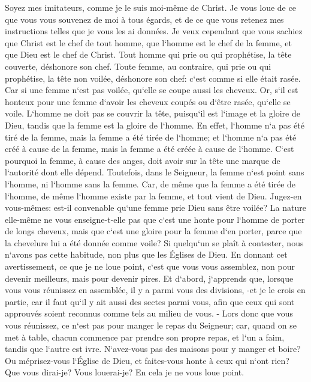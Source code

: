 \verse Soyez mes imitateurs, comme je le suis moi-même de Christ. 
\verse Je vous loue de ce que vous vous souvenez de moi à tous égards, et de ce que vous retenez mes instructions telles que je vous les ai données. 
\verse Je veux cependant que vous sachiez que Christ est le chef de tout homme, que l`homme est le chef de la femme, et que Dieu est le chef de Christ. 
\verse Tout homme qui prie ou qui prophétise, la tête couverte, déshonore son chef. 
\verse Toute femme, au contraire, qui prie ou qui prophétise, la tête non voilée, déshonore son chef: c`est comme si elle était rasée. 
\verse Car si une femme n`est pas voilée, qu`elle se coupe aussi les cheveux. Or, s`il est honteux pour une femme d`avoir les cheveux coupés ou d`être rasée, qu`elle se voile. 
\verse L`homme ne doit pas se couvrir la tête, puisqu`il est l`image et la gloire de Dieu, tandis que la femme est la gloire de l`homme. 
\verse En effet, l`homme n`a pas été tiré de la femme, mais la femme a été tirée de l`homme; 
\verse et l`homme n`a pas été créé à cause de la femme, mais la femme a été créée à cause de l`homme. 
\verse C`est pourquoi la femme, à cause des anges, doit avoir sur la tête une marque de l`autorité dont elle dépend. 
\verse Toutefois, dans le Seigneur, la femme n`est point sans l`homme, ni l`homme sans la femme. 
\verse Car, de même que la femme a été tirée de l`homme, de même l`homme existe par la femme, et tout vient de Dieu. 
\verse Jugez-en vous-mêmes: est-il convenable qu`une femme prie Dieu sans être voilée? 
\verse La nature elle-même ne vous enseigne-t-elle pas que c`est une honte pour l`homme de porter de longs cheveux, 
\verse mais que c`est une gloire pour la femme d`en porter, parce que la chevelure lui a été donnée comme voile? 
\verse Si quelqu`un se plaît à contester, nous n`avons pas cette habitude, non plus que les Églises de Dieu. 
\verse En donnant cet avertissement, ce que je ne loue point, c`est que vous vous assemblez, non pour devenir meilleurs, mais pour devenir pires. 
\verse Et d`abord, j`apprends que, lorsque vous vous réunissez en assemblée, il y a parmi vous des divisions, -et je le crois en partie, 
\verse car il faut qu`il y ait aussi des sectes parmi vous, afin que ceux qui sont approuvés soient reconnus comme tels au milieu de vous. - 
\verse Lors donc que vous vous réunissez, ce n`est pas pour manger le repas du Seigneur; 
\verse car, quand on se met à table, chacun commence par prendre son propre repas, et l`un a faim, tandis que l`autre est ivre. 
\verse N`avez-vous pas des maisons pour y manger et boire? Ou méprisez-vous l`Église de Dieu, et faites-vous honte à ceux qui n`ont rien? Que vous dirai-je? Vous louerai-je? En cela je ne vous loue point. 
